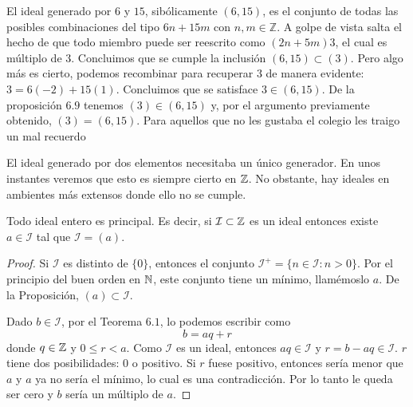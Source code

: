 \documentclass[main.tex]{subfiles}
\begin{document}
\begin{example}
    El ideal generado por $6$ y $15$, sib\'olicamente $(6, 15)$, es el conjunto de todas las posibles combinaciones del tipo $6n + 15m$ con $n, m \in \mathbb Z$. A golpe de vista salta el hecho de que todo miembro puede ser reescrito como $(2n + 5m)3$, el cual es m\'ultiplo de $3$. Concluimos que se cumple la inclusi\'on $(6, 15) \subset (3)$. Pero algo m\'as es cierto, podemos recombinar para recuperar $3$ de manera evidente: $3 = 6(-2) + 15(1)$. Concluimos que se satisface $3 \in (6, 15)$. De la proposici\'on $6.9$ tenemos $(3) \in (6, 15)$ y, por el argumento previamente obtenido, $(3) = (6, 15)$. Para aquellos que no les gustaba el colegio les traigo un mal recuerdo
\end{example}

El ideal generado por dos elementos necesitaba un \'unico generador. En unos instantes veremos que esto es siempre cierto en $\mathbb Z$. No obstante, hay ideales en ambientes m\'as extensos donde ello no se cumple.

\begin{proposition}
    Todo ideal entero es principal. Es decir, si $\mathcal{I} \subset \mathbb Z$ es un ideal entonces existe $a \in \mathcal{I}$ tal que $\mathcal{I} = (a)$.
\end{proposition}

\begin{proof}
    Si $\mathcal{I}$ es distinto de $\{0\}$, entonces el conjunto $\mathcal{I}^+ = \{n \in \mathcal{I} : n > 0\}$. Por el principio del buen orden en $\mathbb N$, este conjunto tiene un m\'inimo, llam\'emoslo $a$. De la Proposici\'on, $(a) \subset \mathcal{I}$.
    
    Dado $b \in \mathcal{I}$, por el Teorema $6.1$, lo podemos escribir como $$b = aq + r$$ donde $q \in \mathbb Z$ y $0 \leq r < a$. Como $\mathcal{I}$ es un ideal, entonces $aq \in \mathcal{I}$ y $r = b - aq \in \mathcal{I}$. $r$ tiene dos posibilidades: $0$ o positivo. Si $r$ fuese positivo, entonces ser\'ia menor que $a$ y $a$ ya no ser\'ia el m\'inimo, lo cual es una contradicci\'on. Por lo tanto le queda ser cero y $b$ ser\'ia un m\'ultiplo de $a$.
\end{proof}
\end{document}
